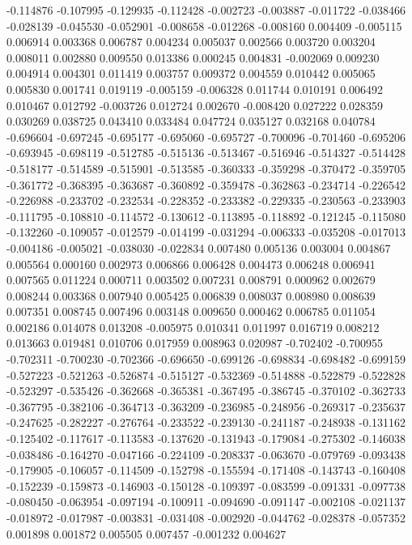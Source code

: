 -0.114876
-0.107995
-0.129935
-0.112428
-0.002723
-0.003887
-0.011722
-0.038466
-0.028139
-0.045530
-0.052901
-0.008658
-0.012268
-0.008160
0.004409
-0.005115
0.006914
0.003368
0.006787
0.004234
0.005037
0.002566
0.003720
0.003204
0.008011
0.002880
0.009550
0.013386
0.000245
0.004831
-0.002069
0.009230
0.004914
0.004301
0.011419
0.003757
0.009372
0.004559
0.010442
0.005065
0.005830
0.001741
0.019119
-0.005159
-0.006328
0.011744
0.010191
0.006492
0.010467
0.012792
-0.003726
0.012724
0.002670
-0.008420
0.027222
0.028359
0.030269
0.038725
0.043410
0.033484
0.047724
0.035127
0.032168
0.040784
-0.696604
-0.697245
-0.695177
-0.695060
-0.695727
-0.700096
-0.701460
-0.695206
-0.693945
-0.698119
-0.512785
-0.515136
-0.513467
-0.516946
-0.514327
-0.514428
-0.518177
-0.514589
-0.515901
-0.513585
-0.360333
-0.359298
-0.370472
-0.359705
-0.361772
-0.368395
-0.363687
-0.360892
-0.359478
-0.362863
-0.234714
-0.226542
-0.226988
-0.233702
-0.232534
-0.228352
-0.233382
-0.229335
-0.230563
-0.233903
-0.111795
-0.108810
-0.114572
-0.130612
-0.113895
-0.118892
-0.121245
-0.115080
-0.132260
-0.109057
-0.012579
-0.014199
-0.031294
-0.006333
-0.035208
-0.017013
-0.004186
-0.005021
-0.038030
-0.022834
0.007480
0.005136
0.003004
0.004867
0.005564
0.000160
0.002973
0.006866
0.006428
0.004473
0.006248
0.006941
0.007565
0.011224
0.000711
0.003502
0.007231
0.008791
0.000962
0.002679
0.008244
0.003368
0.007940
0.005425
0.006839
0.008037
0.008980
0.008639
0.007351
0.008745
0.007496
0.003148
0.009650
0.000462
0.006785
0.011054
0.002186
0.014078
0.013208
-0.005975
0.010341
0.011997
0.016719
0.008212
0.013663
0.019481
0.010706
0.017959
0.008963
0.020987
-0.702402
-0.700955
-0.702311
-0.700230
-0.702366
-0.696650
-0.699126
-0.698834
-0.698482
-0.699159
-0.527223
-0.521263
-0.526874
-0.515127
-0.532369
-0.514888
-0.522879
-0.522828
-0.523297
-0.535426
-0.362668
-0.365381
-0.367495
-0.386745
-0.370102
-0.362733
-0.367795
-0.382106
-0.364713
-0.363209
-0.236985
-0.248956
-0.269317
-0.235637
-0.247625
-0.282227
-0.276764
-0.233522
-0.239130
-0.241187
-0.248938
-0.131162
-0.125402
-0.117617
-0.113583
-0.137620
-0.131943
-0.179084
-0.275302
-0.146038
-0.038486
-0.164270
-0.047166
-0.224109
-0.208337
-0.063670
-0.079769
-0.093438
-0.179905
-0.106057
-0.114509
-0.152798
-0.155594
-0.171408
-0.143743
-0.160408
-0.152239
-0.159873
-0.146903
-0.150128
-0.109397
-0.083599
-0.091331
-0.097738
-0.080450
-0.063954
-0.097194
-0.100911
-0.094690
-0.091147
-0.002108
-0.021137
-0.018972
-0.017987
-0.003831
-0.031408
-0.002920
-0.044762
-0.028378
-0.057352
0.001898
0.001872
0.005505
0.007457
-0.001232
0.004627
